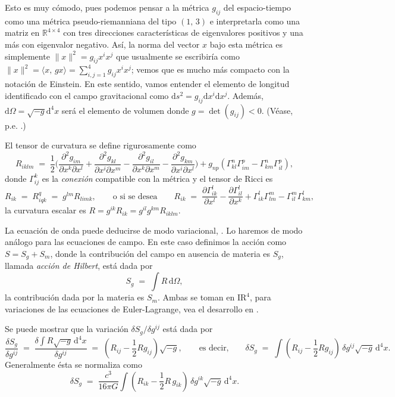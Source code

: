 \documentclass[12pt]{article}
\newcommand{\dx}{\textrm{d}}
\newcommand{\pa}{\partial}
\newcommand{\R}{\mathrm{I\! R}}
\begin{document}
Esto es muy cómodo, pues podemos pensar a la m\'etrica $g_{ij}$ del espacio-tiempo como una métrica pseudo-riemanniana del tipo $(1,\,3)$ e interpretarla como una matriz en $\mathbb{R}^{4 \times 4}$ con tres direcciones características de eigenvalores positivos y una más con eigenvalor negativo. Así, la norma del vector $x$ bajo esta métrica es simplemente $\|x\|^2 = g_{ij}x^ix^j$ que usualmente se escribiría como $\|x\|^2 = \langle x,\,gx\rangle = \sum_{i,j = 1}^4 g_{ij}x^ix^j$; vemos que es mucho más compacto con la notación de Einstein. En este sentido, vamos entender el elemento de longitud identificado con el campo gravitacional como $\dx s^2 = g_{ij}\dx x^i\dx x^j$. Adem\'as, $\dx\Omega = \sqrt{-g}\dx^4x$ ser\'a el elemento de volumen donde $g = \det(g_{ij}) < 0$. (Véase, p.e. \cite{DFN,Wa}.)

El tensor de curvatura se define rigurosamente como
$$R_{iklm} \;=\; \frac{1}{2}\Bigg(\frac{\pa^2g_{im}}{\pa x^k\pa x^l}+\frac{\pa^2g_{kl}}{\pa x^i\pa x^m}-\frac{\pa^2g_{il}}{\pa x^k\pa x^m}-\frac{\pa^2g_{km}}{\pa x^i\pa x^l}\Bigg)+g_{np}(\Gamma^n_{kl}\Gamma^p_{im}-\Gamma^n_{km}\Gamma^p_{il}),$$
donde $\Gamma^k_{ij}$ es la \textit{conexión} compatible con la m\'etrica y el tensor de Ricci es
$$R_{ik} \;=\; R^q_{iqk} \;=\; g^{lm}R_{limk}, \qquad\text{o si se desea} \qquad R_{ik} \;=\; \frac{\pa\Gamma^l_{ik}}{\pa x^l}-\frac{\pa\Gamma^l_{il}}{\pa x^k}+\Gamma^l_{ik}\Gamma^m_{lm}-\Gamma^m_{il}\Gamma^l_{km},$$
la curvatura escalar es $R=g^{ik}R_{ik}=g^{il}g^{km}R_{iklm}$.

La ecuaci\'on de onda puede deducirse de modo variacional, \cite{Castaneda04}. Lo haremos de modo análogo para las ecuaciones de campo. En este caso definimos la acci\'on como $S = S_g+S_m$, donde la contribuci\'on del campo en ausencia de materia es $S_g$, llamada \textit{acci\'on de Hilbert}, est\'a dada por
$$S_g \;=\; \int R\,\dx\Omega,$$
la contribuci\'on dada por la materia es $S_m$. Ambas se toman en $\R^4$, para variaciones de las ecuaciones de Euler-Lagrange, vea el desarrollo en \cite{Castaneda04,DFN,Wa}.

Se puede mostrar que la variaci\'on $\delta S_g/\delta g^{ij}$ est\'a dada por
$$\frac{\delta S_g}{\delta g^{ij}} \;=\; 
  \frac{\delta\int R\sqrt{-g}\,\dx^4x}{\delta g^{ij}} \;=\; \left(R_{ij}-\frac{1}{2} Rg_{ij}\right)\sqrt{-g},
  \qquad \text{es decir,} \qquad
  \delta S_g \;=\; \int \left(R_{ij}-\frac{1}{2} Rg_{ij}\right)\,\delta g^{ij}\sqrt{-g}\,\dx^4x.$$
Generalmente ésta se normaliza como
$$\delta S_g \;=\; \frac{c^3}{16\pi G}\int \left(R_{ik}-\frac{1}{2} R\,g_{ik}\right)\,\delta g^{ik}\sqrt{-g}\,\dx^4x.$$
\end{document}
